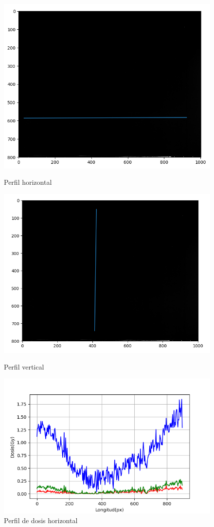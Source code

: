 \begin{figure}[ht] 
	\centering
	\begin{minipage}[b]{0.6\linewidth}
		\centering
		\includegraphics[width=.5\linewidth]{images/imagenPerfilMapaCeroHorizontal.png} 
		\caption{Perfil horizontal} 
		\label{fig:perhor}
		\vspace{4ex}
	\end{minipage}%
	\begin{minipage}[b]{0.6\linewidth}
		\centering
		\includegraphics[width=.5\linewidth]{images/imagenPerfilMapaCeroVertical.png} 
		\caption{Perfil vertical} 
		\vspace{4ex}
	\end{minipage} 
	\begin{minipage}[b]{0.6\linewidth}
		\centering
		\includegraphics[width=.5\linewidth]{images/perfilDosisCeroHorizontal.png} 
		\caption{Perfil de dosis horizontal} 
		\vspace{4ex}
	\end{minipage}%
	\begin{minipage}[b]{0.6\linewidth}

\end{minipage}
\end{figure}
